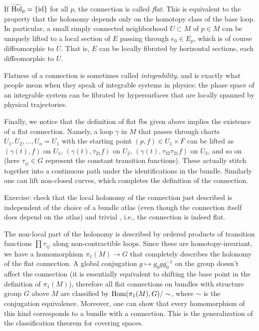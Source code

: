 \begin{example}
	If $\widetilde{\mathrm{Hol}}_p=\{\operatorname{id}\}$ for all $p$, the connection is called \emph{flat}. This is equivalent to the property that the holonomy depends only on the homotopy class of the base loop. In particular, a small simply connected neighborhood $U\subset M$ of $p\in M$ can be uniquely lifted to a local section of $E$ passing through $e_0\in E_p$, which is of course diffeomorphic to $U$. That is, $E$ can be locally fibrated by horizontal sections, each diffeomorphic to $U$. 
	
	Flatness of a connection is sometimes called \emph{integrability}, and is exactly what people mean when they speak of integrable systems in physics: the phase space of an integrable system can be fibrated by hypersurfaces that are locally spanned by physical trajectories.
	
	Finally, we notice that the definition of flat \glspl{fb} given above implies the existence of a flat connection. Namely, a loop $\gamma$ in $M$ that passes through charts $U_1,U_2,\ldots,U_n=U_1$ with the starting point $(p,f)\in U_1\times F$ can be lifted as $(\gamma(t),f)$ on $U_1$, $(\gamma(t),\tau_{21}f)$ on $U_2$, $(\gamma(t),\tau_{32}\tau_{21}f)$ on $U_3$, and so on (here $\tau_{ij}\in G$ represent the constant transition functions). These actually stitch together into a continuous path under the identifications in the bundle. Similarly one can lift non-closed curves, which completes the definition of the connection.
	
	Exercise: check that the local holonomy of the connection just described is independent of the choice of a bundle atlas (even though the connection itself does depend on the atlas) and trivial , i.e., the connection is indeed flat.
	
	The non-local part of the holonomy is described by ordered products of transition functions $\prod \tau_{ij}$ along non-contractible loops. Since these are homotopy-invariant, we have a homomorphism $\pi_1(M)\to G$ that completely describes the holonomy of the flat connection. A global conjugation $g\mapsto g_0 g g_0^{-1}$ on the group doesn't affect the connection (it is essentially equivalent to shifting the base point in the definition of $\pi_1(M)$), therefore all flat connections on bundles with structure group $G$ above $M$ are classified by $\operatorname{Hom}(\pi_1(M),G)/\sim$, where $\sim$ is the conjugation equivalence. Moreover, one can show that every homomorphism of this kind corresponds to a bundle with a connection. This is the generalization of the classification theorem for covering spaces.
	

\end{example}
